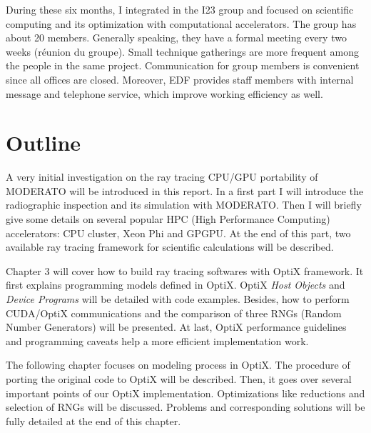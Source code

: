During these six months, I integrated in the I23 group and focused on scientific computing and its optimization with computational accelerators. The group has about 20 members. Generally speaking, they have a formal meeting every two weeks (réunion du groupe). Small technique gatherings are more frequent among the people in the same project. Communication for group members is convenient since all offices are closed. Moreover, EDF provides staff members with internal message and telephone service, which improve working efficiency as well.

\section{Outline}
A very initial investigation on the ray tracing CPU/GPU portability of MODERATO will be introduced in this report. In a first part I will introduce the radiographic inspection and its simulation with MODERATO. Then I will briefly give some details on several popular HPC (High Performance Computing) accelerators: CPU cluster, Xeon Phi and GPGPU. At the end of this part, two available ray tracing framework for scientific calculations will be described.

Chapter 3 will cover how to build ray tracing softwares with OptiX framework. It first explains programming models defined in OptiX. OptiX \textit{Host Objects} and \textit{Device Programs} will be detailed with code examples. Besides, how to perform CUDA/OptiX communications and the comparison of three RNGs (Random Number Generators) will be presented. At last, OptiX performance guidelines and programming caveats help a more efficient implementation work.

The following chapter focuses on modeling process in OptiX. The procedure of porting the original code to OptiX will be described. Then, it goes over several important points of our OptiX implementation. Optimizations like reductions and selection of RNGs will be discussed. Problems and corresponding solutions will be fully detailed at the end of this chapter.

